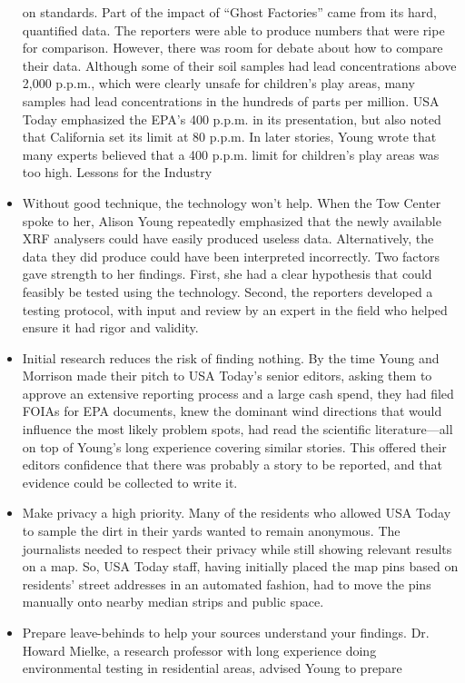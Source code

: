 \begin{itemize}
on standards.
Part of the impact of ``Ghost Factories'' came from its hard, quantified
data. The reporters were able to produce numbers that were ripe for
comparison. However, there was room for debate about how to compare
their data. Although some of their soil samples had lead concentrations
above 2,000 p.p.m., which were clearly unsafe for children's
play areas, many samples had lead concentrations in the hundreds of
parts per million. USA Today emphasized the EPA's 400 p.p.m. in its
presentation, but also noted that California set its limit at 80 p.p.m.
In later stories, Young wrote that many experts believed that a 400
p.p.m. limit for children's play areas was too high.
Lessons for the Industry
\item Without good technique, the technology won't help.
When the Tow Center spoke to her, Alison Young repeatedly emphasized
that the newly available XRF analysers could have easily produced
useless data. Alternatively, the data they did produce could
have been interpreted incorrectly. Two factors gave strength to her
findings. First, she had a clear hypothesis that could feasibly be tested
using the technology. Second, the reporters developed a testing protocol,
with input and review by an expert in the field who helped
ensure it had rigor and validity.
\item Initial research reduces the risk of finding nothing.
By the time Young and Morrison made their pitch to USA Today's
senior editors, asking them to approve an extensive reporting process
and a large cash spend, they had filed FOIAs for EPA documents,
knew the dominant wind directions that would influence the most
likely problem spots, had read the scientific literature—all on top of
Young's long experience covering similar stories. This offered their
editors confidence that there was probably a story to be reported, and
that evidence could be collected to write it.
\item Make privacy a high priority.
Many of the residents who allowed USA Today to sample the dirt in
their yards wanted to remain anonymous. The journalists needed to
respect their privacy while still showing relevant results on a map. So,
USA Today staff, having initially placed the map pins based on residents'
street addresses in an automated fashion, had to move the pins
manually onto nearby median strips and public space.
\item Prepare leave-behinds to help your sources understand
your findings.
Dr. Howard Mielke, a research professor with long experience doing
environmental testing in residential areas, advised Young to prepare

\end{itemize}
